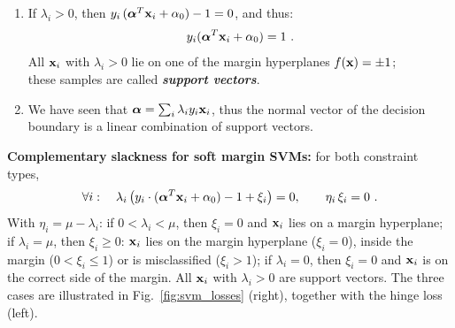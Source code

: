   \begin{enumerate}
    \item If $\lambda_i>0$, then $y_i \, (\bm{\mathrm{\alpha}}^T \bm{\mathrm{x}}_i + \alpha_0) - 1=0$, and thus:
      \begin{displaymath}
        y_i(\bm{\mathrm{\alpha}}^T \bm{\mathrm{x}}_i + \alpha_0) = 1~.
      \end{displaymath}
      All $\bm{\mathrm{x}}_i$ with $\lambda_i>0$ lie on one of the margin hyperplanes $f(\bm{\mathrm{x}})=\pm1$; \\
      these samples are called \textbf{\emph{support vectors}}. \\  
    \item We have seen that $  \bm{\mathrm{\alpha}} = \sum_i \lambda_i y_i \bm{\mathrm{x}}_i $, thus the normal vector of the decision boundary is a linear combination of support vectors.
  \end{enumerate}
  \textbf{Complementary slackness for soft margin SVMs:} for both constraint types,
  \begin{displaymath}
    \forall i: \quad \lambda_i \, \big(y_i\cdot (\bm{\mathrm{\alpha}}^T\bm{\mathrm{x}}_i + \alpha_0) - 1+\xi_i\big) = 0, \qquad \eta_i\,\xi_i=0~.
  \end{displaymath}
  With $\eta_i=\mu-\lambda_i$: if $0<\lambda_i<\mu$, then $\xi_i=0$ and $\bm{\mathrm{x}}_i$ lies on a margin hyperplane; if $\lambda_i=\mu$, then $\xi_i\ge0$: $\bm{\mathrm{x}}_i$ lies on the margin hyperplane ($\xi_i=0$), inside the margin ($0<\xi_i\le1$) or is misclassified ($\xi_i>1$); if $\lambda_i=0$, then $\xi_i=0$ and $\bm{\mathrm{x}}_i$ is on the correct side of the margin. All $\bm{\mathrm{x}}_i$ with $\lambda_i>0$ are support vectors.
  The three cases are illustrated in Fig.~\ref{fig:svm_losses} (right), together with the hinge loss (left).

